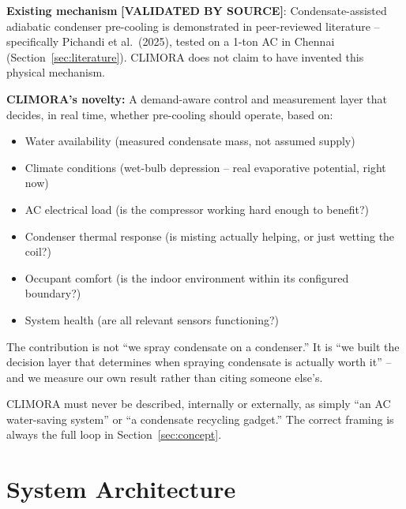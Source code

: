 \documentclass[11pt,a4paper]{article}
\newcommand{\validated}{\textcolor{climoragreen}{\textbf{[VALIDATED BY SOURCE]}}}
\begin{document}
\textbf{Existing mechanism} \validated: Condensate-assisted adiabatic condenser pre-cooling is demonstrated in peer-reviewed literature -- specifically Pichandi et al.\ (2025), tested on a 1-ton AC in Chennai (Section~\ref{sec:literature}). CLIMORA does not claim to have invented this physical mechanism.

\textbf{CLIMORA's novelty:} A demand-aware control and measurement layer that decides, in real time, whether pre-cooling should operate, based on:
\begin{itemize}
    \item Water availability (measured condensate mass, not assumed supply)
    \item Climate conditions (wet-bulb depression -- real evaporative potential, right now)
    \item AC electrical load (is the compressor working hard enough to benefit?)
    \item Condenser thermal response (is misting actually helping, or just wetting the coil?)
    \item Occupant comfort (is the indoor environment within its configured boundary?)
    \item System health (are all relevant sensors functioning?)
\end{itemize}

\begin{keyidea}
The contribution is not ``we spray condensate on a condenser.'' It is ``we built the decision layer that determines when spraying condensate is actually worth it'' -- and we measure our own result rather than citing someone else's.
\end{keyidea}

CLIMORA must never be described, internally or externally, as simply ``an AC water-saving system'' or ``a condensate recycling gadget.'' The correct framing is always the full loop in Section~\ref{sec:concept}.

\section{System Architecture}
\label{sec:architecture}
\end{document}
